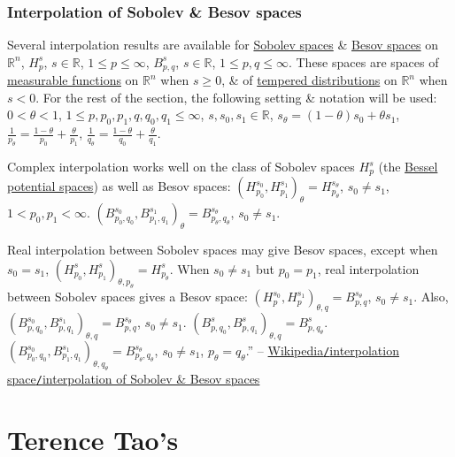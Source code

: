 \documentclass[oneside]{book}
\numberwithin{equation}{section}
\begin{document}
\subsection{Interpolation of Sobolev \& Besov spaces}
Several interpolation results are available for \href{https://en.wikipedia.org/wiki/Sobolev_space}{Sobolev spaces} \& \href{https://en.wikipedia.org/wiki/Besov_space}{Besov spaces} on $\mathbb{R}^n$, $H_p^s$, $s\in\mathbb{R}$, $1\le p\le\infty$, $B_{p,q}^s$, $s\in\mathbb{R}$, $1\le p,q\le\infty$. These spaces are spaces of \href{https://en.wikipedia.org/wiki/Measurable_function}{measurable functions} on $\mathbb{R}^n$ when $s\ge 0$, \& of \href{https://en.wikipedia.org/wiki/Distribution_(mathematics)}{tempered distributions} on $\mathbb{R}^n$ when $s < 0$. For the rest of the section, the following setting \& notation will be used: $0 < \theta < 1$, $1\le p,p_0,p_1,q,q_0,q_1\le\infty$, $s,s_0,s_1\in\mathbb{R}$, $s_\theta = (1 - \theta)s_0 + \theta s_1$, $\frac{1}{p_\theta} = \frac{1 - \theta}{p_0} + \frac{\theta}{p_1}$, $\frac{1}{q_\theta} = \frac{1 - \theta}{q_0} + \frac{\theta}{q_1}$.

Complex interpolation works well on the class of Sobolev spaces $H_p^s$ (the \href{https://en.wikipedia.org/wiki/Sobolev_space#Bessel_potential_spaces}{Bessel potential spaces}) as well as Besov spaces: $(H_{p_0}^{s_0},H_{p_1}^{s_1})_\theta = H_{p_\theta}^{s_\theta}$, $s_0\ne s_1$, $1 < p_0,p_1 < \infty$. $(B_{p_0,q_0}^{s_0},B_{p_1,q_1}^{s_1})_\theta = B_{p_\theta,q_\theta}^{s_\theta}$, $s_0\ne s_1$.

Real interpolation between Sobolev spaces may give Besov spaces, except when $s_0 = s_1$, $(H_{p_0}^s,H_{p_1}^s)_{\theta,p_\theta} = H_{p_\theta}^s$. When $s_0\ne s_1$ but $p_0 = p_1$, real interpolation between Sobolev spaces gives a Besov space: $(H_p^{s_0},H_p^{s_1})_{\theta,q} = B_{p,q}^{s_\theta}$, $s_0\ne s_1$. Also, $(B_{p,q_0}^{s_0},B_{p,q_1}^{s_1})_{\theta,q} = B_{p,q}^{s_\theta}$, $s_0\ne s_1$. $(B_{p,q_0}^s,B_{p,q_1}^s)_{\theta,q} = B_{p,q_\theta}^s$. $(B_{p_0,q_0}^{s_0},B_{p_1,q_1}^{s_1})_{\theta,q_\theta} = B_{p_\theta,q_\theta}^{s_\theta}$, $s_0\ne s_1$, $p_\theta = q_\theta$.'' -- \href{https://en.wikipedia.org/wiki/Interpolation_space#Interpolation_of_Sobolev_and_Besov_spaces}{Wikipedia\texttt{/}interpolation space\texttt{/}interpolation of Sobolev \& Besov spaces}


\chapter{Terence Tao's}
\end{document}
